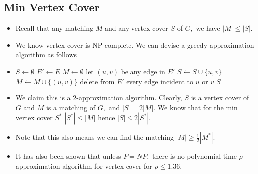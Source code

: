 \documentclass[a4paper,12pt]{article}
\begin{document}
\subsection{Min Vertex Cover}
\begin{itemize}
    \item Recall that any matching $M$ and any vertex cover $S$ of $G,$ we have $|M|\leq |S|.$
    \item We know vertex cover is NP-complete. We can devise a greedy approximation algorithm as follows 
    \item \begin{algorithmic}[1]
        \State $S\gets\emptyset$
        \State $E'\gets E$
        \State $M\gets\emptyset$
            \State let $(u,v)$ be any edge in $E'$
            \State $S\gets S\cup\{u,v\}$
            \State $M\gets M\cup\{(u,v)\}$
            \State delete from $E'$ every edge incident to $u$ or $v$
        \EndWhile
        \State \Return $S$
        \EndProcedure
    \end{algorithmic}
    \item We claim this is a $2$-approximation algorithm. Clearly, $S$ is a vertex cover of $G$ and $M$ is a matching of $G,$ and $|S|=2|M|.$ We know that for the min vertex cover $S^*$ $|S^*|\leq|M|$ hence $|S|\leq 2|S^*|.$
    \item Note that this also means we can find the matching $|M|\geq \frac{1}{2}|M^*|.$
    \item It has also been shown that unless $P=NP,$ there is no polynomial time $\rho$-approximation algorithm for vertex cover for $\rho\leq 1.36.$
\end{itemize}
\end{document}
